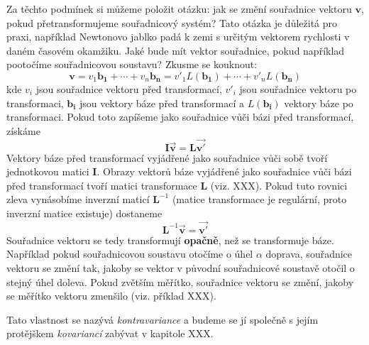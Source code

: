 \documentclass[a5paper,12pt]{amsbook}
\theoremstyle{definition}
\newcommand{\myscalar}[1]{#1}
\newcommand{\myvec}[1]{\mathbf{#1}}
\newcommand{\mycoord}[1]{\overrightarrow{\mathbf{#1}}}
\newcommand{\mymatrix}[1]{\mathbf{#1}}
\newcommand{\mymap}[1]{#1}
\begin{document}
Za těchto podmínek si můžeme položit otázku: jak se změní souřadnice vektoru $\myvec{v}$,
pokud přetransformujeme souřadnicový systém? Tato otázka je důležitá pro praxi, například
Newtonovo jablko padá k zemi s určitým vektorem rychlosti v daném časovém okamžiku. Jaké
bude mít vektor souřadnice, pokud například pootočíme souřadnicovou soustavu? Zkusme se
kouknout:
\begin{equation*}
\myvec{v} = \myscalar{v_1}\myvec{b_1} + \cdots + \myscalar{v_n}\myvec{b_n}
          = \myscalar{v'_1}\mymap{L}(\myvec{b_1}) + \cdots + \myscalar{v'_n}\mymap{L}(\myvec{b_n})
\end{equation*}
kde $\myscalar{v_i}$ jsou souřadnice vektoru před transformací, $\myscalar{v'_i}$ jsou souřadnice
vektoru po transformaci, $\myvec{b_i}$ jsou vektory báze před transformací a $\mymap{L}(\myvec{b_i})$
vektory báze po transformaci. Pokud toto zapíšeme jako souřadnice vůči bázi před transformací, získáme
\begin{equation*}
\mymatrix{I}\mycoord{v} = \mymatrix{L}\mycoord{v'}
\end{equation*}
Vektory báze před transformací vyjádřené jako souřadnice vůči sobě tvoří jednotkovou matici
$\mymatrix{I}$. Obrazy vektorů báze vyjádřené jako souřadnice vůči bázi před transformací
tvoří matici transformace $\mymatrix{L}$ (viz. XXX). Pokud tuto rovnici zleva vynásobíme
inverzní maticí $\mymatrix{L}^{-1}$ (matice transformace je regulární, proto inverzní
matice existuje) dostaneme
\begin{equation*}
\mymatrix{L}^{-1}\mycoord{v} = \mycoord{v'}
\end{equation*}
Souřadnice vektoru se tedy transformují \textbf{opačně}, než se transformuje báze.
Například pokud souřadnicovou soustavu otočíme o úhel $\alpha$ doprava, souřadnice vektoru
se změní tak, jakoby se vektor v původní souřadnicové soustavě otočil o stejný úhel doleva.
Pokud zvětším měřítko, souřadnice vektoru se změní, jakoby se měřítko vektoru zmenšilo (viz.
příklad XXX).

Tato vlastnost se nazývá \textit{kontravariance} a budeme se jí společně s jejím protějškem
\textit{kovariancí} zabývat v kapitole XXX.
\end{document}
